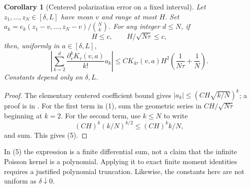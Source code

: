 \documentclass[11pt]{article}
\newtheorem{corollary}{Corollary}
\begin{document}
\begin{corollary}[Centered polarization error on a fixed interval]
Let $z_1,\ldots,z_N\in[\delta,L]$ have mean $v$ and range at most $H$.
Set $a_k=e_k(z_1-v,\ldots,z_N-v)/\binom Nk$.
For any integer $d\le N$, if
\[
 H\le c,\qquad H/\sqrt{N\tau}\le c,
\]
then, uniformly in $a\in[\delta,L]$,
\[
 \left|\sum_{k=2}^d
   \frac{\partial_v^kK_\tau(v,a)}{k!}a_k\right|
 \le C K_{4\tau}(v,a)H^2
                      \left(\frac1{N\tau}+\frac1N\right). \tag{5}
\]
Constants depend only on $\delta,L$.
\end{corollary}
\begin{proof}
The elementary centered coefficient bound gives
$|a_k|\le(CH\sqrt{k/N})^k$; a proof is in
.
For the first term in (1), sum the geometric series in
$CH/\sqrt{N\tau}$ beginning at $k=2$.
For the second term, use $k\le N$ to write
\[
 (CH)^k(k/N)^{k/2}\le (CH)^k k/N,
\]
and sum. This gives (5).
\end{proof}

In (5) the expression is a finite differential sum, not a claim that
the infinite Poisson kernel is a polynomial. Applying it to exact
finite moment identities requires a justified polynomial truncation.
Likewise, the constants here are not uniform as $\delta\downarrow0$.
\end{document}
